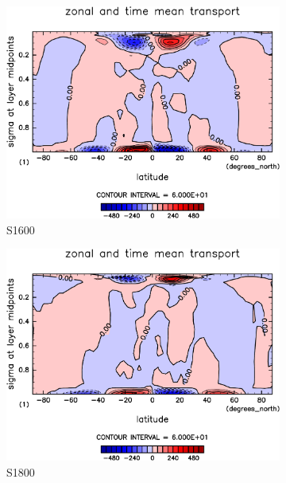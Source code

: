\documentclass[body]{subfiles}
\begin{document}
\begin{figure}[t]
	\begin{subfigure}{.4\textwidth}
		\centering
		\includegraphics[width=\columnwidth]{S1600/MeriHeatTransTest@dryStatEn_M,time=3650:4015-crop-rotate.pdf}
		\caption{S1600}\label{乾燥静的エネルギー平均子午面循環S1600}
	\end{subfigure}
	\begin{subfigure}{.4\textwidth}
		\centering
		\includegraphics[width=\columnwidth]{S1800/MeriHeatTransTest@dryStatEn_M,time=3650:4015-crop-rotate.pdf}
		\caption{S1800}\label{乾燥静的エネルギー平均子午面循環S1800}
	\end{subfigure}
	\begin{subfigure}{.4\textwidth}

\end{subfigure}
\end{figure}
\end{document}
